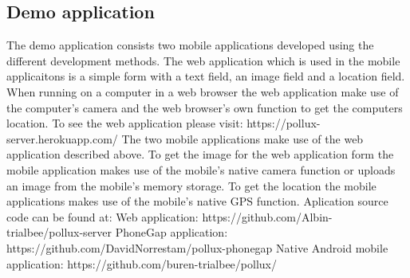\documentclass{cslthse-msc}
\begin{document}
\subsection{Demo application}
The demo application consists two mobile applications developed using the different development methods. The web application which is used in the mobile applicaitons is a simple form with a text field, an image field and a location field.
\newline\newline
When running on a computer in a web browser the web application make use of the computer's camera and the web browser's own function to get the computers location. To see the web application please visit: https://pollux-server.herokuapp.com/
\newline\newline
The two mobile applications make use of the web application described above. To get the image for the web application form the mobile application makes use of the mobile's native camera function or uploads an image from the mobile's memory storage. To get the location the mobile applications makes use of the mobile's native GPS function. 
\newline\newline
Aplication source code can be found at:
\newline
Web application: https://github.com/Albin-trialbee/pollux-server
\newline
PhoneGap application: https://github.com/DavidNorrestam/pollux-phonegap
\newline
Native Android mobile application: https://github.com/buren-trialbee/pollux/
\end{document}
